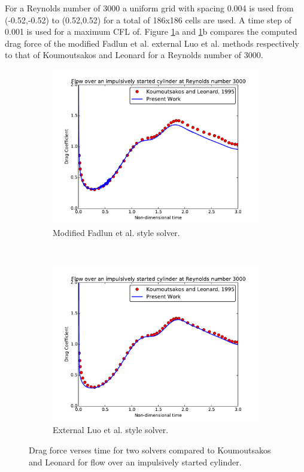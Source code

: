 \documentclass[onehalf,11pt]{beavtex}
\begin{document}
For a Reynolds number of 3000 a uniform grid with spacing 0.004 is used from (-0.52,-0.52) to (0.52,0.52) for a total of 186x186 cells are used.
A time step of 0.001 is used for a maximum CFL of.
Figure \ref{fig:cy3000}a and \ref{fig:cy3000}b compares the computed drag force of the modified Fadlun et al. external Luo et al. methods respectively to that of Koumoutsakos and Leonard for a Reynolds number of 3000.
\begin{figure}[ht]
	\centering
	\begin{subfigure}{0.4\textwidth}
		\includegraphics[width=\linewidth]{cy3000fadlun}
		\caption{Modified Fadlun et al. style solver.}
	\end{subfigure}
	~
	\begin{subfigure}{0.4\textwidth}
		\includegraphics[width=\linewidth]{cy3000luo}
		\caption{External Luo et al. style solver.}
	\end{subfigure}
	\caption{Drag force verses time for two solvers compared to Koumoutsakos and Leonard for flow over an impulsively started cylinder.}
	\label{fig:cy3000}
\end{figure}
\end{document}
